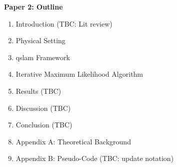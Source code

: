 \clearpage
{\large \textbf{Paper 2: Outline }}

\begin{enumerate}
	\item Introduction (TBC: Lit review)
	\item Physical Setting
	\item qslam Framework
	\item Iterative Maximum Likelihood Algorithm
	\item Results (TBC)
	\item Discussion (TBC)
	\item Conclusion (TBC)
	\item Appendix A: Theoretical Background
	\item Appendix B: Pseudo-Code (TBC: update notation)
\end{enumerate}

